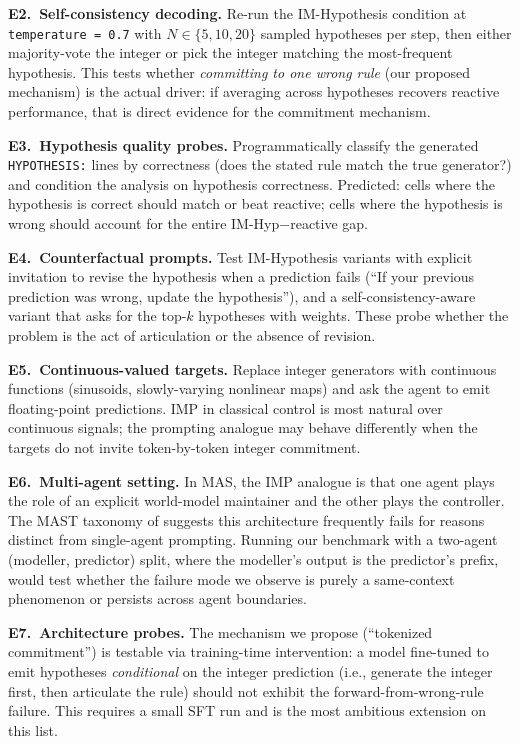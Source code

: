 \documentclass[11pt]{article}
\begin{document}
\textbf{E2.\ Self-consistency decoding.}  Re-run the IM-Hypothesis
condition at \verb|temperature = 0.7| with $N \in \{5, 10, 20\}$
sampled hypotheses per step, then either majority-vote the integer
or pick the integer matching the most-frequent hypothesis.  This
tests whether \emph{committing to one wrong rule} (our proposed
mechanism) is the actual driver: if averaging across hypotheses
recovers reactive performance, that is direct evidence for the
commitment mechanism.

\textbf{E3.\ Hypothesis quality probes.}  Programmatically classify
the generated \verb|HYPOTHESIS:| lines by correctness (does the
stated rule match the true generator?) and condition the analysis
on hypothesis correctness.  Predicted: cells where the hypothesis
is correct should match or beat reactive; cells where the
hypothesis is wrong should account for the entire IM-Hyp$-$reactive
gap.

\textbf{E4.\ Counterfactual prompts.}  Test IM-Hypothesis variants
with explicit invitation to revise the hypothesis when a prediction
fails (``If your previous prediction was wrong, update the
hypothesis''), and a self-consistency-aware variant that asks for
the top-$k$ hypotheses with weights.  These probe whether the
problem is the act of articulation or the absence of revision.

\textbf{E5.\ Continuous-valued targets.}  Replace integer
generators with continuous functions (sinusoids, slowly-varying
nonlinear maps) and ask the agent to emit floating-point
predictions.  IMP in classical control is most natural over
continuous signals; the prompting analogue may behave differently
when the targets do not invite token-by-token integer
commitment.

\textbf{E6.\ Multi-agent setting.}  In MAS, the IMP analogue is
that one agent plays the role of an explicit world-model maintainer
and the other plays the controller.  The MAST taxonomy of
\citet{cemri2025why} suggests this architecture frequently
fails for reasons distinct from single-agent prompting.  Running
our benchmark with a two-agent (modeller, predictor) split, where
the modeller's output is the predictor's prefix, would test
whether the failure mode we observe is purely a same-context
phenomenon or persists across agent boundaries.

\textbf{E7.\ Architecture probes.}  The mechanism we propose
(``tokenized commitment'') is testable via training-time
intervention: a model fine-tuned to emit hypotheses
\emph{conditional} on the integer prediction (i.e., generate the
integer first, then articulate the rule) should not exhibit the
forward-from-wrong-rule failure.  This requires a small SFT run
and is the most ambitious extension on this list.
\end{document}
